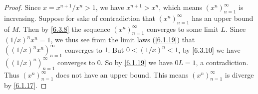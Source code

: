 \begin{proof}
  Since \(x = x^{n + 1} / x^n > 1\), we have \(x^{n + 1} > x^n\), which means \((x^n)_{n = 1}^\infty\) is increasing.
  Suppose for sake of contradiction that \((x^n)_{n = 1}^\infty\) has an upper bound of \(M\).
  Then by \cref{6.3.8} the sequence \((x^n)_{n = 1}^\infty\) converges to some limit \(L\).
  Since \((1 / x)^n x^n = 1\), we thus see from the limit laws (\cref{6.1.19}) that \(((1 / x)^n x^n)_{n = 1}^\infty\) converges to \(1\).
  But \(0 < (1 / x)^n < 1\), by \cref{6.3.10} we have \(((1 / x)^n)_{n = 1}^\infty\) converges to \(0\).
  So by \cref{6.1.19} we have \(0L = 1\), a contradiction.
  Thus \((x^n)_{n = 1}^\infty\) does not have an upper bound.
  This means \((x^n)_{n = 1}^\infty\) is diverge by \cref{6.1.17}.
\end{proof}